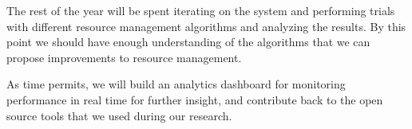 \documentclass{sig-alternate}
\begin{document}
The rest of the year will be spent iterating on the system and performing trials with different resource management algorithms and analyzing the results. By this point we should have enough understanding of the algorithms that we can propose improvements to resource management.

As time permits, we will build an analytics dashboard for monitoring performance in real time for further insight, and contribute back to the open source tools that we used during our research.






\end{document}
